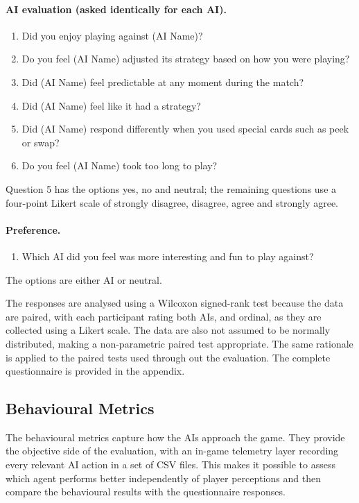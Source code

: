 \documentclass[12pt,a4paper,oneside]{report}
\begin{document}
\paragraph{AI evaluation (asked identically for each AI).}
\begin{enumerate}
  \item Did you enjoy playing against (AI Name)?
  \item Do you feel (AI Name) adjusted its strategy based on how you were playing?
  \item Did (AI Name) feel predictable at any moment during the match?
  \item Did (AI Name) feel like it had a strategy?
  \item Did (AI Name) respond differently when you used special cards such as peek
        or swap?
  \item Do you feel (AI Name) took too long to play?
\end{enumerate}
Question 5 has the options yes, no and neutral; the remaining questions use a
four-point Likert scale of strongly disagree, disagree, agree and strongly agree.

\paragraph{Preference.}
\begin{enumerate}
  \item Which AI did you feel was more interesting and fun to play against?
\end{enumerate}
The options are either AI or neutral.

The responses are analysed using a Wilcoxon signed-rank test because the data are paired, with each participant rating both AIs, and ordinal, as they are collected using a Likert scale. The data are also not assumed to be normally distributed, making a non-parametric paired test appropriate. The same rationale is applied to the paired tests used through out the evaluation. The complete questionnaire is provided in the appendix.

\subsection{Behavioural Metrics}
\label{sec:behav-metrics}

The behavioural metrics capture how the AIs approach the game. They provide the objective side of the evaluation, with an in-game telemetry layer recording every relevant AI action in a set of CSV files. This makes it possible to assess which agent performs better independently of player perceptions and then compare the behavioural results with the questionnaire responses.
\end{document}
